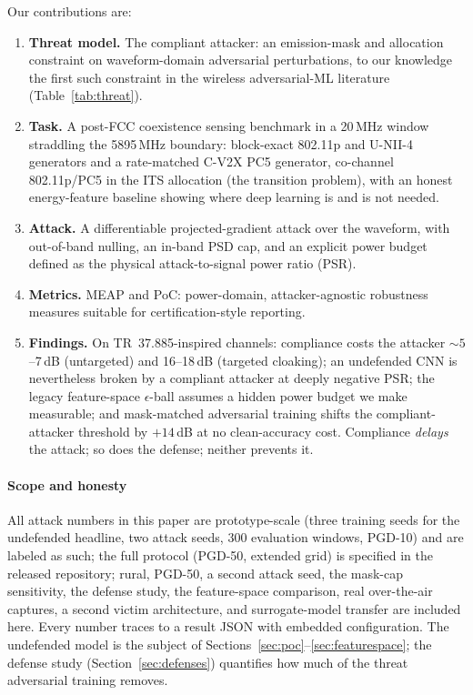 \documentclass[review]{elsarticle}
\begin{document}
Our contributions are:
\begin{enumerate}
  \item \textbf{Threat model.} The compliant attacker: an emission-mask and
  allocation constraint on waveform-domain adversarial perturbations, to our
  knowledge the first such constraint in the wireless adversarial-ML
  literature (Table~\ref{tab:threat}).
  \item \textbf{Task.} A post-FCC coexistence sensing benchmark in a
  20\,MHz window straddling the 5895\,MHz boundary: block-exact 802.11p and
  U-NII-4 generators and a rate-matched C-V2X PC5 generator, co-channel
  802.11p/PC5 in the ITS allocation (the transition problem), with an
  honest energy-feature baseline showing where deep learning is and is not
  needed.
  \item \textbf{Attack.} A differentiable projected-gradient attack over the
  waveform, with out-of-band nulling, an in-band PSD cap, and an explicit
  power budget defined as the physical attack-to-signal power ratio (PSR).
  \item \textbf{Metrics.} MEAP and PoC: power-domain, attacker-agnostic
  robustness measures suitable for certification-style reporting.
  \item \textbf{Findings.} On TR~37.885-inspired channels: compliance costs
  the attacker ${\sim}5$--7\,dB (untargeted) and 16--18\,dB (targeted
  cloaking); an undefended CNN is nevertheless broken by a compliant attacker
  at deeply negative PSR; the legacy feature-space $\epsilon$-ball assumes a
  hidden power budget we make measurable; and mask-matched adversarial
  training shifts the compliant-attacker threshold by $+14$\,dB at no
  clean-accuracy cost. Compliance \emph{delays} the attack; so does the
  defense; neither prevents it.
\end{enumerate}

\paragraph{Scope and honesty} All attack numbers in this paper are
prototype-scale (three training seeds for the undefended headline, two
attack seeds, 300 evaluation windows, PGD-10) and are labeled as such; the
full protocol (PGD-50, extended grid) is specified in the released
repository; rural, PGD-50, a second attack seed, the mask-cap sensitivity,
the defense study, the feature-space comparison, real over-the-air
captures, a second victim architecture, and surrogate-model transfer are
included here. Every number traces to a result JSON with embedded
configuration. The undefended model is
the subject of Sections~\ref{sec:poc}--\ref{sec:featurespace}; the defense
study (Section~\ref{sec:defenses}) quantifies how much of the threat
adversarial training removes.
\end{document}
